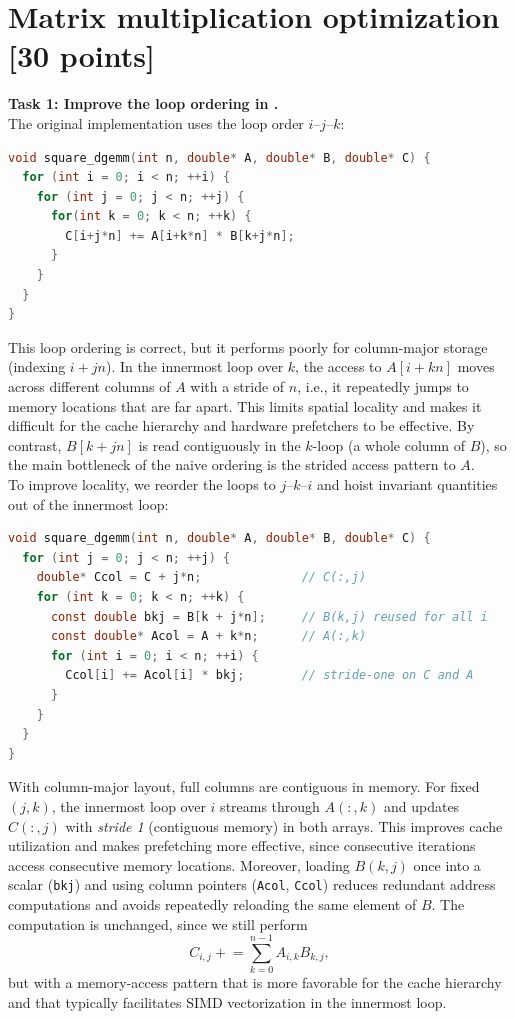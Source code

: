 \documentclass[unicode,10pt,a4paper,oneside,numbers=endperiod,openany]{scrartcl}
\begin{document}
\section{Matrix multiplication optimization [30 points]}

\textbf{Task 1: Improve the loop ordering in .}\\
The original implementation uses the loop order $i$--$j$--$k$:
\begin{lstlisting}[style=grayverbatim,language=C]
void square_dgemm(int n, double* A, double* B, double* C) {
  for (int i = 0; i < n; ++i) {
    for (int j = 0; j < n; ++j) {
      for(int k = 0; k < n; ++k) {
        C[i+j*n] += A[i+k*n] * B[k+j*n];
      }
    }
  }
}
\end{lstlisting}
This loop ordering is correct, but it performs poorly for column-major storage (indexing $i + jn$). 
In the innermost loop over $k$, the access to $A[i + k n]$ moves across different columns of $A$ with a stride of $n$, i.e., it repeatedly jumps to memory locations that are far apart. 
This limits spatial locality and makes it difficult for the cache hierarchy and hardware prefetchers to be effective. 
By contrast, $B[k + jn]$ is read contiguously in the $k$-loop (a whole column of $B$), so the main bottleneck of the naive ordering is the strided access pattern to $A$.\\

To improve locality, we reorder the loops to $j$--$k$--$i$ and hoist invariant quantities out of the innermost loop:
\begin{lstlisting}[style=grayverbatim,language=C]
void square_dgemm(int n, double* A, double* B, double* C) {
  for (int j = 0; j < n; ++j) {
    double* Ccol = C + j*n;              // C(:,j)
    for (int k = 0; k < n; ++k) {
      const double bkj = B[k + j*n];     // B(k,j) reused for all i
      const double* Acol = A + k*n;      // A(:,k)
      for (int i = 0; i < n; ++i) {
        Ccol[i] += Acol[i] * bkj;        // stride-one on C and A
      }
    }
  }
}
\end{lstlisting}

With column-major layout, full columns are contiguous in memory. For fixed $(j,k)$, the innermost loop over $i$ streams through $A(:,k)$ and updates $C(:,j)$ with \emph{stride 1} (contiguous memory) in both arrays. 
This improves cache utilization and makes prefetching more effective, since consecutive iterations access consecutive memory locations. 
Moreover, loading $B(k,j)$ once into a scalar (\texttt{bkj}) and using column pointers (\texttt{Acol}, \texttt{Ccol}) reduces redundant address computations and avoids repeatedly reloading the same element of $B$. 
The computation is unchanged, since we still perform
\[
C_{i,j} \mathrel{+}= \sum_{k=0}^{n-1} A_{i,k} B_{k,j},
\]
but with a memory-access pattern that is more favorable for the cache hierarchy and that typically facilitates SIMD vectorization in the innermost loop.\\[0.5em]
\end{document}

